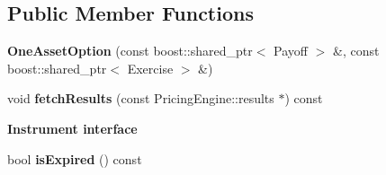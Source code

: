 \subsection*{Public Member Functions}
\begin{DoxyCompactItemize}
\item 
{\bfseries One\+Asset\+Option} (const boost\+::shared\+\_\+ptr$<$ Payoff $>$ \&, const boost\+::shared\+\_\+ptr$<$ Exercise $>$ \&)\label{class_quant_lib_1_1_one_asset_option_a9611017c17fac3c45aa9f281a4b2ecd6}

\item 
void {\bfseries fetch\+Results} (const Pricing\+Engine\+::results $\ast$) const \label{class_quant_lib_1_1_one_asset_option_af682c7e1d276a29462693dba9bbba488}

\end{DoxyCompactItemize}
\begin{Indent}{\bf Instrument interface}\par
\begin{DoxyCompactItemize}
\item 
bool {\bfseries is\+Expired} () const \label{class_quant_lib_1_1_one_asset_option_aa3c541a90955be727dae042539518fa0}

\end{DoxyCompactItemize}
\end{Indent}
